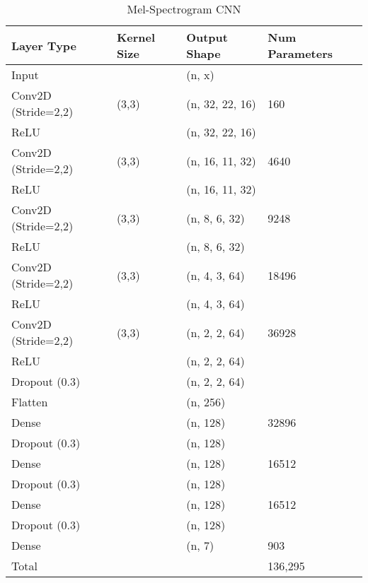 \begin{table}[h]
\caption{Mel-Spectrogram CNN}
\centering
\begin{tabular}{l|l|l|l}
Layer Type & Kernel Size & Output Shape & Num Parameters \\ \hline
Input & \ & (n, x) & \\
Conv2D (Stride=2,2) & (3,3) & (n, 32, 22, 16) & 160\\
ReLU                &       & (n, 32, 22, 16) & \\
Conv2D (Stride=2,2) & (3,3) & (n, 16, 11, 32) & 4640\\
ReLU                &       & (n, 16, 11, 32) & \\
Conv2D (Stride=2,2) & (3,3) & (n, 8, 6, 32) & 9248\\
ReLU                &       & (n, 8, 6, 32) & \\
Conv2D (Stride=2,2) & (3,3) & (n, 4, 3, 64) & 18496\\
ReLU                &       & (n, 4, 3, 64) & \\
Conv2D (Stride=2,2) & (3,3) & (n, 2, 2, 64) & 36928\\
ReLU                &       & (n, 2, 2, 64) & \\
Dropout (0.3)       &       & (n, 2, 2, 64) & \\
Flatten             &       & (n, 256) & \\
Dense 				& 		& (n, 128) & 32896\\
Dropout (0.3) 		& 		& (n, 128)  & \\
Dense 				& 		& (n, 128) & 16512\\
Dropout (0.3) 		& 		& (n, 128)  & \\
Dense 				& 		& (n, 128) & 16512\\
Dropout (0.3) 		& 		& (n, 128)  & \\
Dense               &       & (n, 7) & 903\\
\hline
\hline
Total               &       &        & 136,295\\
\end{tabular}
\end{table}
